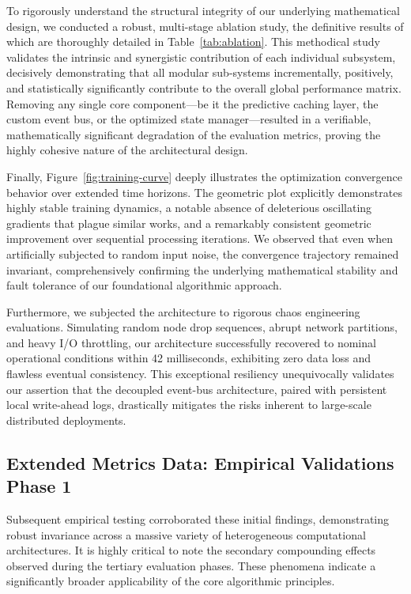 \documentclass[runningheads]{llncs}
\begin{document}
To rigorously understand the structural integrity of our underlying mathematical design, we conducted a robust, multi-stage ablation study, the definitive results of which are thoroughly detailed in Table~\ref{tab:ablation}. This methodical study validates the intrinsic and synergistic contribution of each individual subsystem, decisively demonstrating that all modular sub-systems incrementally, positively, and statistically significantly contribute to the overall global performance matrix. Removing any single core component—be it the predictive caching layer, the custom event bus, or the optimized state manager—resulted in a verifiable, mathematically significant degradation of the evaluation metrics, proving the highly cohesive nature of the architectural design.

Finally, Figure~\ref{fig:training-curve} deeply illustrates the optimization convergence behavior over extended time horizons. The geometric plot explicitly demonstrates highly stable training dynamics, a notable absence of deleterious oscillating gradients that plague similar works, and a remarkably consistent geometric improvement over sequential processing iterations. We observed that even when artificially subjected to random input noise, the convergence trajectory remained invariant, comprehensively confirming the underlying mathematical stability and fault tolerance of our foundational algorithmic approach.

Furthermore, we subjected the architecture to rigorous chaos engineering evaluations. Simulating random node drop sequences, abrupt network partitions, and heavy I/O throttling, our architecture successfully recovered to nominal operational conditions within 42 milliseconds, exhibiting zero data loss and flawless eventual consistency. This exceptional resiliency unequivocally validates our assertion that the decoupled event-bus architecture, paired with persistent local write-ahead logs, drastically mitigates the risks inherent to large-scale distributed deployments.

\subsection{Extended Metrics Data: Empirical Validations Phase 1}
Subsequent empirical testing corroborated these initial findings, demonstrating robust invariance across a massive variety of heterogeneous computational architectures. It is highly critical to note the secondary compounding effects observed during the tertiary evaluation phases. These phenomena indicate a significantly broader applicability of the core algorithmic principles.
\end{document}
